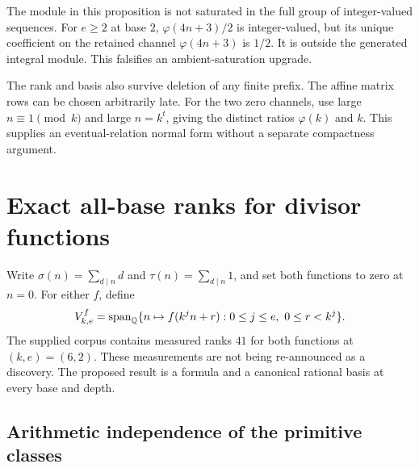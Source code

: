 \documentclass[11pt,a4paper]{article}
\theoremstyle{definition}\newtheorem{definition}[theorem]{Definition}
\theoremstyle{remark}\newtheorem*{remark}{Remark}
\newcommand{\ph}{\varphi}\newcommand{\Span}{\operatorname{span}}\newcommand{\ord}{\operatorname{ord}}
\begin{document}
The module in this proposition is not saturated in the full group of
integer-valued sequences. For $e\ge2$ at base $2$,
$\ph(4n+3)/2$ is integer-valued, but its unique coefficient on the retained
channel $\ph(4n+3)$ is $1/2$. It is outside the generated integral module.
This falsifies an ambient-saturation upgrade.

The rank and basis also survive deletion of any finite prefix. The affine
matrix rows can be chosen arbitrarily late. For the two zero channels, use
large $n\equiv1\pmod k$ and large $n=k^t$, giving the distinct ratios
$\ph(k)$ and $k$. This supplies an eventual-relation normal form without a
separate compactness argument.

\section{Exact all-base ranks for divisor functions}\label{sec:divisor}

Write $\sigma(n)=\sum_{d\mid n}d$ and $\tau(n)=\sum_{d\mid n}1$, and set both
functions to zero at $n=0$. For either $f$, define
\[
 V^f_{k,e}=\Span_\Q\{n\mapsto f(k^jn+r):0\le j\le e,\ 0\le r<k^j\}.
\]
The supplied corpus contains measured ranks $41$ for both functions at
$(k,e)=(6,2)$. These measurements are not being re-announced as a discovery.
The proposed result is a formula and a canonical rational basis at every
base and depth.

\subsection{Arithmetic independence of the primitive classes}
\end{document}
